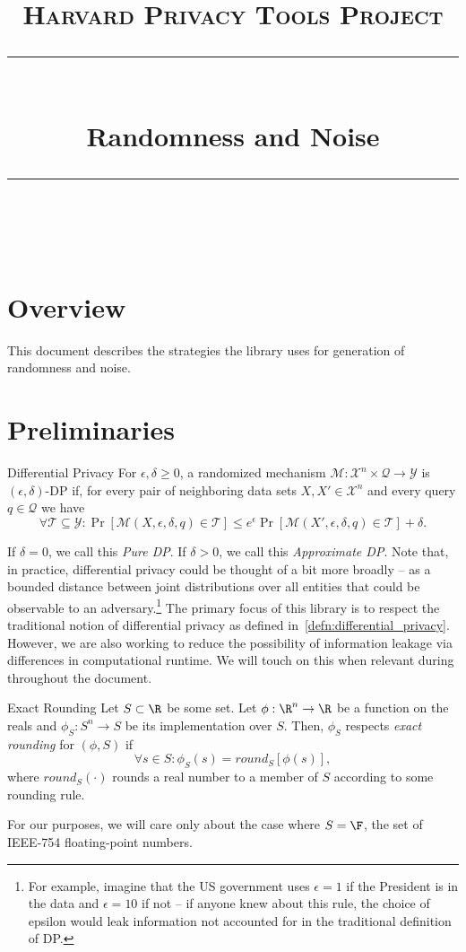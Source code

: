 \documentclass[11pt]{scrartcl} %
\title{
	\normalfont\normalsize
	\textsc{Harvard Privacy Tools Project}\\ %
	\vspace{25pt} %
	\rule{\linewidth}{0.5pt}\\ %
	\vspace{20pt} %
	{\huge Randomness and Noise}\\ %
	\vspace{12pt} %
	\rule{\linewidth}{2pt}\\ %
	\vspace{12pt} %
}
\author{} %
\date{} %
\begin{document}
\maketitle

\tableofcontents

\section{Overview}
This document describes the strategies the library uses for generation of randomness and noise.

\section{Preliminaries}
\begin{definition}
	\label{defn:differential_privacy}
	Differential Privacy \cite{DMNS06} \newline
	For $\epsilon, \delta \geq 0$, a randomized mechanism
	$\mathcal{M}: \mathcal{X}^n \times \mathcal{Q} \rightarrow \mathcal{Y}$ is
	$(\epsilon, \delta)$-DP if, for every pair of neighboring data sets $X, X' \in \mathcal{X}^n$ and
	every query $q \in \mathcal{Q}$ we have
	\[ \forall \mathcal{T} \subseteq \mathcal{Y}: \Pr[\mathcal{M}(X, \epsilon, \delta, q) \in \mathcal{T}] \leq e^{\epsilon} \Pr[\mathcal{M}(X', \epsilon, \delta, q) \in \mathcal{T}] + \delta. \]
\end{definition}
If $\delta = 0$, we call this \emph{Pure DP}. If $\delta > 0$, we call this \emph{Approximate DP}.
Note that, in practice, differential privacy could be thought of a bit more broadly -- as a bounded
distance between joint distributions over all entities that could be observable to an adversary.\footnote{For example, imagine that the 
US government uses $\epsilon = 1$ if the President is in the data and $\epsilon = 10$
if not -- if anyone knew about this rule, the choice of epsilon would leak information not accounted for in the
traditional definition of DP.} The primary focus of this library is to respect the traditional notion of 
differential privacy as defined in~\ref{defn:differential_privacy}. However, we are also working to
reduce the possibility of information leakage via differences in computational runtime. We will touch on this when relevant 
during throughout the document.

\begin{definition}
	\label{defn:exact_rounding}
	Exact Rounding \newline
	Let $S \subset \R$ be some set.
	Let $\phi: \R^n \rightarrow \R$ be a function on the reals and $\phi_{S}: S^n \rightarrow S$ be its implementation over $S$.
	Then, $\phi_{S}$ respects \emph{exact rounding} for $(\phi, S)$ if
	\[ \forall s \in S: \phi_{S}(s) = round_{S}[\phi(s)], \]
	where $round_{S}(\cdot)$ rounds a real number to a member of $S$ according to some rounding rule.
\end{definition}
For our purposes, we will care only about the case where $S = \F$, the set of IEEE-754 floating-point numbers.
\end{document}

